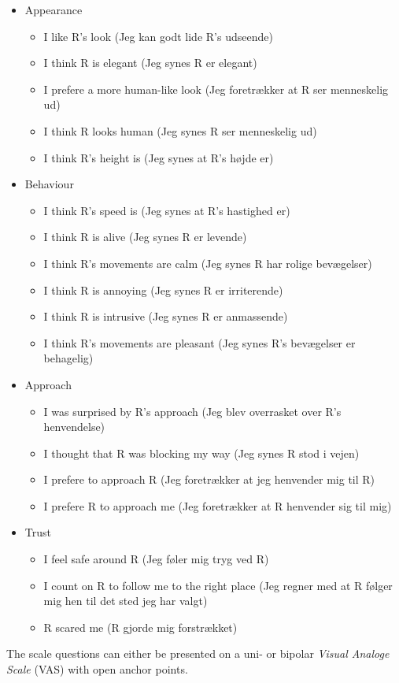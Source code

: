 \begin{itemize}
\item Appearance 
  \begin{itemize}
  \item I like R's look (Jeg kan godt lide R's udseende)
  \item I think R is elegant (Jeg synes R er elegant)
  \item I prefere a more human-like look (Jeg foretrækker at R ser menneskelig ud)
  \item I think R looks human (Jeg synes R ser menneskelig ud)
  \item I think R's height is (Jeg synes at R's højde er)
\end{itemize}
\item Behaviour
  \begin{itemize}
  \item I think R's speed is (Jeg synes at R's hastighed er)
  \item I think R is alive (Jeg synes R er levende)
  \item I think R's movements are calm (Jeg synes R har rolige bevægelser)
  \item I think R is annoying (Jeg synes R er irriterende)
  \item I think R is intrusive (Jeg synes R er anmassende)
  \item I think R's movements are pleasant (Jeg synes R's bevægelser er behagelig)
\end{itemize}
\item Approach 
\begin{itemize}
  \item I was surprised by R's approach (Jeg blev overrasket over R's henvendelse)
  \item I thought that R was blocking my way (Jeg synes R stod i vejen) 
  \item I prefere to approach R (Jeg foretrækker at jeg henvender mig til R)
  \item I prefere R to approach me (Jeg foretrækker at R henvender sig til mig) 
\end{itemize}
\item Trust
\begin{itemize}
  \item I feel safe around R (Jeg føler mig tryg ved R)
  \item I count on R to follow me to the right place (Jeg regner med at R følger mig hen til det sted jeg har valgt) 
  \item R scared me (R gjorde mig forstrækket)\\
\end{itemize}
\end{itemize}
%
The scale questions can either be presented on a uni- or bipolar \textit{Visual Analoge Scale} (VAS) with open anchor points. 



